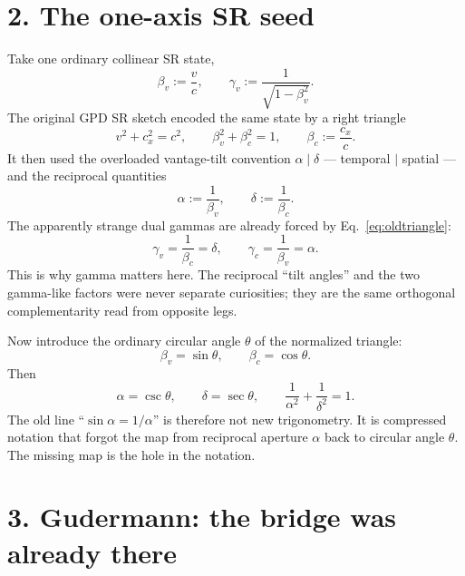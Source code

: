 \documentclass[8pt,twocolumn]{extarticle}
\begin{document}
\section*{2. The one-axis SR seed}

Take one ordinary collinear SR state,
\begin{equation}
\beta_v:=\frac vc,
\qquad
\gamma_v:=\frac{1}{\sqrt{1-\beta_v^2}}.
\label{eq:sr}
\end{equation}
The original GPD SR sketch encoded the same state by a right triangle
\begin{equation}
 v^2+c_x^2=c^2,
\qquad
\beta_v^2+\beta_c^2=1,
\qquad
\beta_c:=\frac{c_x}{c}.
\label{eq:oldtriangle}
\end{equation}
It then used the overloaded vantage-tilt convention
$\alpha\mid\delta$ --- temporal $\mid$ spatial --- and the reciprocal
quantities
\begin{equation}
\alpha:=\frac1{\beta_v},
\qquad
\delta:=\frac1{\beta_c}.
\label{eq:reciprocal}
\end{equation}
The apparently strange dual gammas are already forced by
Eq.~\eqref{eq:oldtriangle}:
\begin{equation}
\gamma_v=\frac1{\beta_c}=\delta,
\qquad
\gamma_c=\frac1{\beta_v}=\alpha.
\label{eq:oldcross}
\end{equation}
This is why gamma matters here. The reciprocal ``tilt angles'' and the two
gamma-like factors were never separate curiosities; they are the same
orthogonal complementarity read from opposite legs.

Now introduce the ordinary circular angle $\theta$ of the normalized triangle:
\begin{equation}
\beta_v=\sin\theta,
\qquad
\beta_c=\cos\theta.
\label{eq:circle}
\end{equation}
Then
\begin{equation}
\boxed{
\alpha=\csc\theta,
\qquad
\delta=\sec\theta,
\qquad
\frac{1}{\alpha^2}+\frac{1}{\delta^2}=1.
}
\label{eq:apertures}
\end{equation}
The old line ``$\sin\alpha=1/\alpha$'' is therefore not new trigonometry. It
is compressed notation that forgot the map from reciprocal aperture $\alpha$
back to circular angle $\theta$. The missing map is the hole in the notation.

\section*{3. Gudermann: the bridge was already there}
\end{document}
